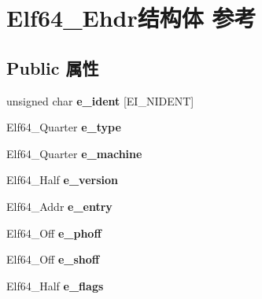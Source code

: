 \hypertarget{struct_elf64___ehdr}{}\section{Elf64\+\_\+\+Ehdr结构体 参考}
\label{struct_elf64___ehdr}
\subsection*{Public 属性}
\begin{DoxyCompactItemize}
\item 
\mbox{\label{struct_elf64___ehdr_acdd2e122af003c5b5708d1ae75b4a85c}} 
unsigned char {\bfseries e\+\_\+ident} \mbox{[}E\+I\+\_\+\+N\+I\+D\+E\+NT\mbox{]}
\item 
\mbox{\label{struct_elf64___ehdr_aa9025130f56573621f6077a20c3568bf}} 
Elf64\+\_\+\+Quarter {\bfseries e\+\_\+type}
\item 
\mbox{\label{struct_elf64___ehdr_adf3b0501b2e56f5c3f6deb89caa09eaa}} 
Elf64\+\_\+\+Quarter {\bfseries e\+\_\+machine}
\item 
\mbox{\label{struct_elf64___ehdr_a05db1816a6628b83b9885bd19873dc2b}} 
Elf64\+\_\+\+Half {\bfseries e\+\_\+version}
\item 
\mbox{\label{struct_elf64___ehdr_a943c7d038a3cc3c1115e84b4cd19966d}} 
Elf64\+\_\+\+Addr {\bfseries e\+\_\+entry}
\item 
\mbox{\label{struct_elf64___ehdr_adc7d13d5c0e0eb4b62f0f898f03b2e66}} 
Elf64\+\_\+\+Off {\bfseries e\+\_\+phoff}
\item 
\mbox{\label{struct_elf64___ehdr_a63fca3f9b273e5fd4d190d9cb7fba9b0}} 
Elf64\+\_\+\+Off {\bfseries e\+\_\+shoff}
\item 
\mbox{\label{struct_elf64___ehdr_a1437d065a2f66ea2dd7a5e2899e1fb2d}} 
Elf64\+\_\+\+Half {\bfseries e\+\_\+flags}
\item 
\mbox{\label{struct_elf64___ehdr_af88ca730d3e1fe5bef29920b70e93808}} 

\end{DoxyCompactItemize}

